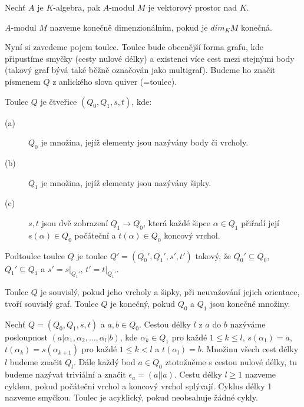     \begin{pzn}
      Nechť $A$ je $K$-algebra, pak $A$-modul $M$ je vektorový prostor nad $K$.      
    \end{pzn}
    
    \begin{dfn}
      $A$-modul $M$ nazveme konečně dimenzionálním, pokud je $dim_K M$ konečná.
    \end{dfn}
    
    Nyní si zavedeme pojem toulce. Toulec bude obecnější forma grafu, kde 
    připustíme smyčky (cesty nulové délky) a existenci více cest mezi stejnými 
    body (takový graf bývá také běžně označován jako multigraf). Budeme ho značit 
    písmenem $Q$ z anlického slova quiver (=toulec).
  
    \begin{dfn}
      Toulec $Q$ je čtveřice $(Q_0,Q_1,s,t)$, kde:      
      \begin{description}
        \item[(a)] $Q_0$ je množina, jejíž elementy jsou nazývány body či 
        vrcholy.
        \item[(b)] $Q_1$ je množina, jejíž elementy jsou nazývány šipky.
        \item[(c)] $s,t$ jsou dvě zobrazení $Q_1\rightarrow Q_0$, která každé šipce
        $\alpha\in Q_1$ přiřadí její $s(\alpha)\in Q_0$ počáteční a
        $t(\alpha)\in Q_0$ koncový vrchol.
      \end{description}   
      
      Podtoulec toulce $Q$ je toulec $Q'=(Q_0',Q_1',s',t')$ takový, že $Q_0'\subseteq 
      Q_0$, $Q_1'\subseteq Q_1$ a $s'=s|_{Q_1'}$, $t'=t|_{Q_1'}$. 
      
      Toulec $Q$ je souvislý, pokud jeho vrcholy a šipky, při neuvažování jejich orientace, 
      tvoří souvislý graf. Toulec $Q$ je konečný, pokud $Q_0$ a $Q_1$ jsou konečné
      množiny.
      
      Nechť $Q=(Q_0,Q_1,s,t)$ a $a,b\in Q_0$. Cestou délky $l$ z $a$ do $b$ nazýváme posloupnost 
      $(a|\alpha_1,\alpha_2,\ldots,\alpha_l|b)$, kde $\alpha_k\in Q_1$ pro každé 
      $1\leq k \leq l$, $s(\alpha_1)=a$, $t(\alpha_k)=s(\alpha_{k+1})$ pro každé 
      $1\leq k < l$ a $t(\alpha_l)=b$. Množinu všech cest délky $l$ budeme 
      značit $Q_l$. Dále každý bod $a\in Q_0$ ztotožněme s cestou nulové délky, 
      tu budeme nazývat triviální a značit $\epsilon_a=(a||a)$. Cestu délky $l\geq 1$ 
      nazveme cyklem, pokud počáteční vrchol a koncový vrchol splývají. Cyklus 
      délky 1 nazveme smyčkou. Toulec je acyklický, pokud neobsahuje žádné 
      cykly.  
    \end{dfn}    
    

